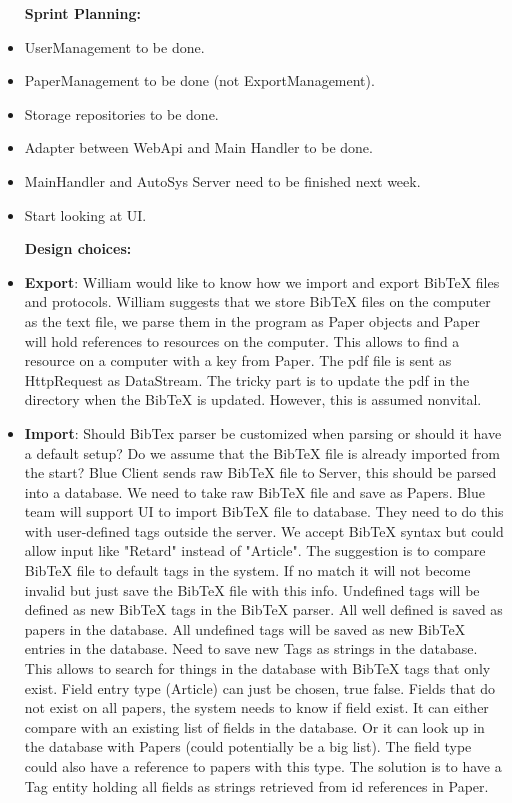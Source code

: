 \begin{itemize}
	\item [\textbf{Sprint Planning:}]
	\item UserManagement to be done. 
	\item PaperManagement to be done (not ExportManagement). 
	\item Storage repositories to be done. 
	\item Adapter between WebApi and Main Handler to be done. 
	\item MainHandler and AutoSys Server need to be finished next week. 
	\item Start looking at UI. 
\end{itemize}

\begin{itemize}
	\item [\textbf{Design choices:}]
	\item \textbf{Export}: William would like to know how we import and export BibTeX files and protocols. William suggests that we store BibTeX files on the computer as the text file, we parse them in the program as Paper objects and Paper will hold references to resources on the computer. This allows to find a resource on a computer with a key from Paper. The pdf file is sent as HttpRequest as DataStream. The tricky part is to update the pdf in the directory when the BibTeX is updated. However, this is assumed nonvital.
	\item \textbf{Import}: Should BibTex parser be customized when parsing or should it have a default setup? Do we assume that the BibTeX file is already imported from the start? Blue Client sends raw BibTeX file to Server, this should be parsed into a database. We need to take raw BibTeX file and save as Papers. Blue team will support UI to import BibTeX file to database. They need to do this with user-defined tags outside the server. We accept BibTeX syntax but could allow input like "Retard" instead of "Article". The suggestion is to compare BibTeX file to default tags in the system. If no match it will not become invalid but just save the BibTeX file with this info. Undefined tags will be defined as new BibTeX tags in the BibTeX parser. All well defined is saved as papers in the database. All undefined tags will be saved as new BibTeX entries in the database. Need to save new Tags as strings in the database. This allows to search for things in the database with BibTeX tags that only exist. Field entry type (Article) can just be chosen, true false. Fields that do not exist on all papers, the system needs to know if field exist. It can either compare with an existing list of fields in the database. Or it can look up in the database with Papers (could potentially be a big list). The field type could also have a reference to papers with this type. The solution is to have a Tag entity holding all fields as strings retrieved from id references in Paper. 

\end{itemize}
